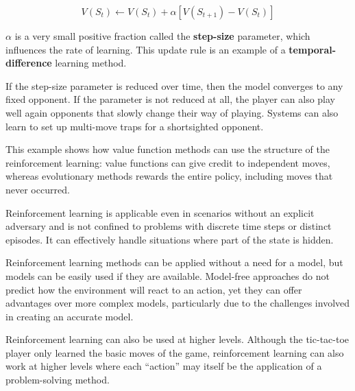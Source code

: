 \documentclass{article}
\begin{document}
\[
V(S_t) \gets V(S_t) + \alpha \left[ V(S_{t+1}) - V(S_t)\right]
\]

$\alpha$ is a very small positive fraction called the \textbf{step-size}
parameter, which influences the rate of learning. This update rule
is an example of a \textbf{temporal-difference} learning method.

If the step-size parameter is reduced over time, then the model 
converges to any fixed opponent. If the parameter is not reduced
at all, the player can also play well again opponents that 
slowly change their way of playing. Systems can also learn to set
up multi-move traps for a shortsighted opponent.

This example shows how value function methods can use the structure of
the reinforcement learning: value functions can give credit to
independent moves, whereas evolutionary methods rewards the entire
policy, including moves that never occurred.

Reinforcement learning is applicable even in scenarios without an
explicit adversary and is not confined to problems with discrete time
steps or distinct episodes. It can effectively handle situations
where part of the state is hidden.

Reinforcement learning methods can be applied without a need for
a model, but models can be easily used if they are available.
Model-free approaches do not predict how the environment will
react to an action, yet they can offer advantages over more
complex models, particularly due to the challenges involved in
creating an accurate model.


Reinforcement learning can also be used at higher levels. Although
the tic-tac-toe player only learned the basic moves of the game,
reinforcement learning can also work at higher levels where each
``action'' may itself be the application of a problem-solving
method.
\end{document}
